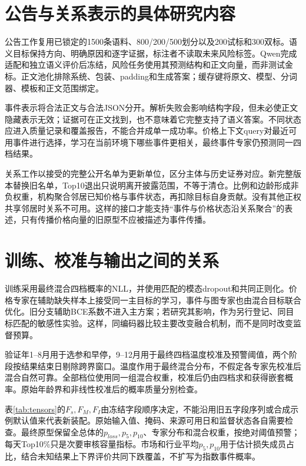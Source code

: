 \section{公告与关系表示的具体研究内容}
公告工作复用已锁定的1500条语料、800/200/500划分以及200试标和300双标。语义目标保持方向、明确原因和逐字证据，标注者不读取未来风险标签。Qwen完成适配和独立语义评价后冻结，风险任务使用其预测结构和正文向量，而非测试金标。正文池化排除系统、包装、padding和生成答案；缓存键将原文、模型、分词器、模板和正文范围绑定。

事件表示将合法正文与合法JSON分开。解析失败会影响结构字段，但未必使正文隐藏表示无效；证据可在正文找到，也不意味着它完整支持了语义答案。不同状态应进入质量记录和覆盖报告，不能合并成单一成功率。价格上下文query对最近可用事件进行选择，学习在当前环境下哪些事件更相关，最终事件专家仍预测同一四档结果。

关系工作以接受的完整公开名单为更新单位，区分主体与历史证券对应。新完整版本替换旧名单，Top10退出只说明离开披露范围，不等于清仓。比例和边龄形成非负权重，机构聚合邻居已知价格与事件状态，再扣除目标自身贡献。没有其他正权共享邻居时关系不可用。这样的接口才能支持“事件与价格状态沿关系聚合”的表述，只有传播价格向量的旧原型不应被描述为事件传播。

\section{训练、校准与输出之间的关系}
训练采用最终混合四档概率的NLL，并使用匹配的模态dropout和共同正则化。价格专家在辅助缺失样本上接受同一主目标的学习，事件与图专家也由混合目标联合优化。旧分支辅助BCE系数不进入主方案；若研究其影响，作为另行登记、同目标匹配的敏感性实验。这样，同编码器比较主要改变融合机制，而不是同时改变监督预算。

验证年1--8月用于选参和早停，9--12月用于最终四档温度校准及预警阈值，两个阶段按结果结束日剔除跨界窗口。温度作用于最终混合分布，不假定各专家先校准后混合自然可靠。全部档位使用同一组混合权重，校准后仍由四档求和获得嵌套概率。原始年龄界和非线性校准后的概率质量分别检查。


表\ref{tab:tensors}的$F_s,F_M,F_I$由冻结字段顺序决定，不能沿用旧五字段序列或合成示例默认值来代表新装配。原始输入值、掩码、来源可用日和监督状态各自需要检查。最终原型保留全总体的$p_{loss},p_5,p_{10}$、专家分布和混合权重，按绝对阈值预警；每天Top10\%只是次要审核容量指标。市场和行业平均$p_5,p_{10}$用于估计损失成员占比，结合未知结果上下界评价共同下跌覆盖，不扩写为指数事件概率。
